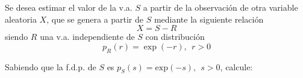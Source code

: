 \ifspanish

\question[25] %

Se desea estimar el valor de la v.a. $S$ a partir de la observación de otra variable aleatoria $X$, que se genera a partir de $S$ mediante la siguiente relación
$$X = S -R $$
siendo $R$ una v.a. independiente de $S$ con distribución
$$p_R(r) = \exp(-r), ~~r>0$$
Sabiendo que la f.d.p. de $S$ es $p_S(s) = \text{exp}(-s), ~~s>0$, calcule:

